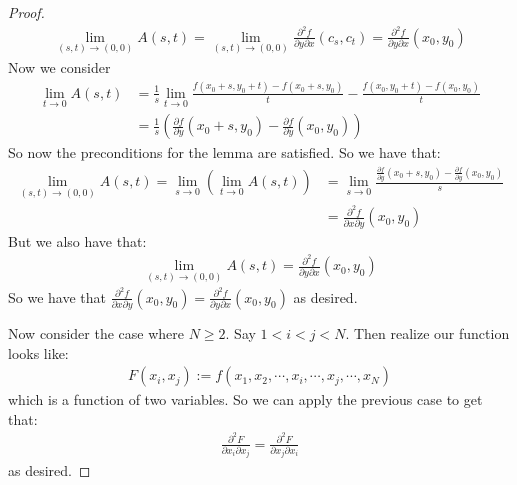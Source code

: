 \documentclass{report}
\begin{document}
\begin{proof}
\begin{align*}
        \lim_{(s,t) \to (0, 0)} A(s, t) = \lim_{(s,t) \to (0, 0)} \frac{\partial^2 f}{\partial y \partial x}(c_s, c_t) = \frac{\partial^2 f}{\partial y \partial x}(x_0, y_0)
    \end{align*}
    Now we consider
    \begin{align*}
        \lim_{t \to 0} A(s, t) &= \frac{1}{s} \lim_{t \to 0} \frac{f(x_0 + s, y_0 + t) - f(x_0 + s, y_0)}{t}  - \frac{f(x_0, y_0 + t) - f(x_0, y_0)}{t} \\
        &= \frac{1}{s} \left(\frac{\partial f}{\partial y}(x_0 + s, y_0) - \frac{\partial f}{\partial y}(x_0, y_0)\right)
    \end{align*}
    So now the preconditions for the lemma are satisfied. So we have that:
    \begin{align*}
        \lim_{(s, t) \to (0, 0)} A(s, t) = \lim_{s \to 0} \left( \lim_{t \to 0} A(s, t) \right) &= \lim_{s\to 0} \frac{\frac{\partial f}{\partial y}(x_0 + s, y_0) - \frac{\partial f}{\partial y}(x_0, y_0)}{s} \\
        &= \frac{\partial^2 f}{\partial x \partial y}(x_0, y_0)
    \end{align*}
    But we also have that:
    \begin{align*}
        \lim_{(s, t) \to (0, 0)}A(s, t) = \frac{\partial^2 f}{\partial y \partial x}(x_0, y_0)
    \end{align*}
    So we have that $\frac{\partial^2 f}{\partial x \partial y}(x_0, y_0) = \frac{\partial^2 f}{\partial y \partial x}(x_0, y_0)$ as desired.

    Now consider the case where $N \geq 2$. Say $1 < i < j < N$. Then realize our function looks like:
    \begin{align*}
        F(x_i, x_j) := f(x_1, x_2, \cdots, x_i, \cdots, x_j, \cdots, x_N)
    \end{align*}
    which is a function of two variables. So we can apply the previous case to get that:
    \begin{align*}
        \frac{\partial^2 F}{\partial x_i \partial x_j} = \frac{\partial^2 F}{\partial x_j \partial x_i}
    \end{align*}
    as desired.
\end{proof}
\newpage
\end{document}
